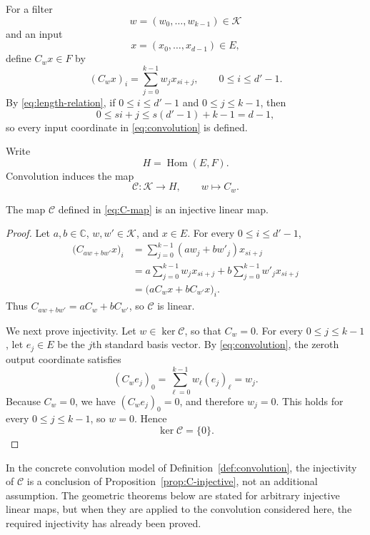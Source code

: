 \documentclass{siamonline250211}
\newcommand{\CC}{\mathbb C}
\newcommand{\Hom}{\operatorname{Hom}}
\newcommand{\cK}{\mathcal K}
\newcommand{\cC}{\mathcal C}
\begin{document}
\begin{definition}\label{def:convolution}
For a filter
\[
  w=(w_0,\ldots,w_{k-1})\in\cK
\]
and an input
\[
  x=(x_0,\ldots,x_{d-1})\in E,
\]
define $C_wx\in F$ by
\begin{equation}\label{eq:convolution}
  (C_wx)_i=\sum_{j=0}^{k-1}w_jx_{si+j},
  \qquad 0\leq i\leq d'-1.
\end{equation}
By \eqref{eq:length-relation}, if $0\leq i\leq d'-1$ and
$0\leq j\leq k-1$, then
\[
  0\leq si+j\leq s(d'-1)+k-1=d-1,
\]
so every input coordinate in \eqref{eq:convolution} is defined.
\end{definition}

Write
\[
  H=\Hom(E,F).
\]
Convolution induces the map
\begin{equation}\label{eq:C-map}
  \cC:\cK\longrightarrow H,
  \qquad w\longmapsto C_w.
\end{equation}

\begin{proposition}
\label{prop:C-injective}
The map $\cC$ defined in \eqref{eq:C-map} is an injective linear map.
\end{proposition}

\begin{proof}
Let $a,b\in\CC$, $w,w'\in\cK$, and $x\in E$. For every
$0\leq i\leq d'-1$,
\[
\begin{aligned}
  \bigl(C_{aw+bw'}x\bigr)_i
  &=\sum_{j=0}^{k-1}(aw_j+bw'_j)x_{si+j}\\
  &=a\sum_{j=0}^{k-1}w_jx_{si+j}
    +b\sum_{j=0}^{k-1}w'_jx_{si+j}\\
  &=\bigl(aC_wx+bC_{w'}x\bigr)_i.
\end{aligned}
\]
Thus $C_{aw+bw'}=aC_w+bC_{w'}$, so $\cC$ is linear.

We next prove injectivity. Let $w\in\ker\cC$, so that $C_w=0$. For every
$0\leq j\leq k-1$, let $e_j\in E$ be the $j$th standard basis vector. By
\eqref{eq:convolution}, the zeroth output coordinate satisfies
\[
  (C_we_j)_0
  =\sum_{\ell=0}^{k-1}w_\ell(e_j)_\ell
  =w_j.
\]
Because $C_w=0$, we have $(C_we_j)_0=0$, and therefore $w_j=0$. This holds for
every $0\leq j\leq k-1$, so $w=0$. Hence
\[
  \ker\cC=\{0\}.
\]
\end{proof}

\begin{remark}\label{rem:no-faithfulness-assumption}
In the concrete convolution model of Definition~\ref{def:convolution}, the
injectivity of $\cC$ is a conclusion of Proposition~\ref{prop:C-injective}, not
an additional assumption. The geometric theorems below are stated for arbitrary
injective linear maps, but when they are applied to the convolution considered
here, the required injectivity has already been proved.
\end{remark}
\end{document}
